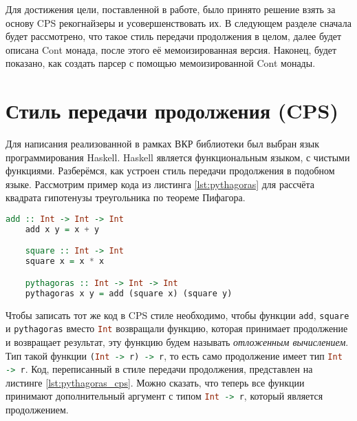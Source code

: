 \documentclass[times]{itmo-student-thesis}
\begin{document}
Для достижения цели, поставленной в работе, было принято решение взять за основу CPS рекогнайзеры и усовершенствовать их.
В следующем разделе сначала будет рассмотрено, что такое стиль передачи продолжения в целом, далее будет описана Cont монада,
после этого её мемоизированная версия. Наконец, будет показано, как создать парсер с помощью мемоизированной Cont монады.



\section{Стиль передачи продолжения (CPS)}\label{sec:cps}

Для написания реализованной в рамках ВКР библиотеки был выбран язык программирования Haskell. Haskell является функциональным языком, 
с чистыми функциями. Разберёмся, как устроен стиль передачи продолжения в подобном языке. Рассмотрим пример кода из листинга 
\ref{lst:pythagoras} для рассчёта квадрата гипотенузы треугольника\cite{noauthor_haskellcontinuation_nodate} по теореме Пифагора.

\begin{lstlisting}[language=Haskell,float=!h,caption={Теорема Пифагора},label={lst:pythagoras}]
    add :: Int -> Int -> Int
    add x y = x + y

    square :: Int -> Int
    square x = x * x

    pythagoras :: Int -> Int -> Int
    pythagoras x y = add (square x) (square y)
\end{lstlisting}

Чтобы записать тот же код в CPS стиле необходимо, чтобы функции \lstinline[language=Haskell]{add}, 
\lstinline[language=Haskell]{square} и \lstinline[language=Haskell]{pythagoras} вместо \lstinline[language=Haskell]{Int}
возвращали функцию, которая принимает продолжение и возвращает результат, эту функцию будем называть \textit{отложенным вычислением}. Тип такой функции \lstinline[language=Haskell]{(Int -> r) -> r}, 
то есть само продолжение имеет тип \lstinline[language=Haskell]{Int -> r}. Код, переписанный в стиле передачи продолжения, 
представлен на листинге \ref{lst:pythagoras_cps}. Можно сказать, что теперь все функции принимают дополнительный аргумент 
с типом \lstinline[language=Haskell]{Int -> r}, который является продолжением.
\end{document}
